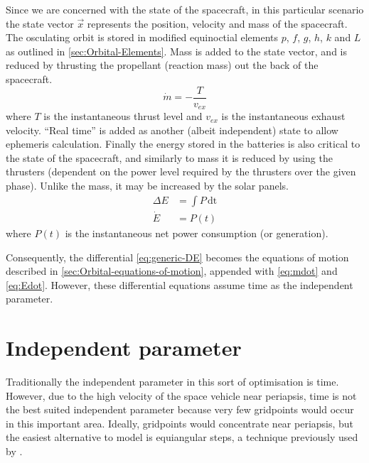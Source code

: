 Since we are concerned with the state of the spacecraft, in this particular scenario the state vector $\vec{x}$ represents the position, velocity and mass of the spacecraft. The osculating orbit is stored in modified equinoctial elements $p$, $f$, $g$, $h$, $k$ and $L$ as outlined in \autoref{sec:Orbital-Elements}. Mass is added to the state vector, and is reduced by thrusting the propellant (reaction mass) out the back of the spacecraft.
\begin{equation}
\dot{m}=-\frac{T}{v_{ex}} \label{eq:mdot}
\end{equation}
where $T$ is the instantaneous thrust level and $v_{ex}$ is the instantaneous exhaust velocity. \enquote{Real time} is added as another (albeit independent) state to allow ephemeris calculation. Finally the energy stored in the batteries is also critical to the state of the spacecraft, and similarly to mass it is reduced by using the thrusters (dependent on the power level required by the thrusters over the given phase). Unlike the mass, it may be increased by the solar panels.
\begin{subequations}
\begin{align}
\Delta E &= \int P\,\text{dt} \label{eq:delta-E}\\
\dot{E} &= P(t) \label{eq:Edot}
\end{align} 
\end{subequations} where $P(t)$ is the instantaneous net power consumption (or generation).

Consequently, the differential \autoref{eq:generic-DE} becomes the equations of motion described in \autoref{sec:Orbital-equations-of-motion}, appended with \autoref{eq:mdot} and \autoref{eq:Edot}. However, these differential equations assume time as the independent parameter.

\section{Independent parameter} \label{sub:Independent-parameter}

Traditionally the independent parameter in this sort of optimisation is time. However, due to the high velocity of the space vehicle near periapsis, time is not the best suited independent parameter because very few gridpoints would occur in this important area. Ideally, gridpoints would concentrate near periapsis, but the easiest alternative to model is equiangular steps, a technique previously used by \textcite{Betts2003}. 

